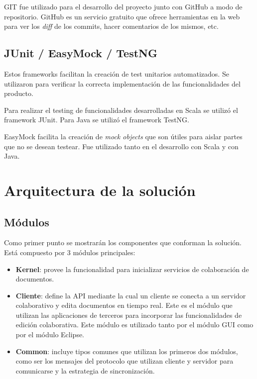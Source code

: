 \documentclass[12pt,a4paper]{article}
\let\stdsection\section
\renewcommand\section{\newpage\stdsection}
\begin{document}
GIT fue utilizado para el desarrollo del proyecto junto con GitHub \cite{github} a modo de repositorio. GitHub es un servicio
gratuito que ofrece herramientas en la web para ver los \textit{diff} de los commits, hacer comentarios de los mismos, etc.

\subsection{JUnit \cite{junit} / EasyMock \cite{easymock} / TestNG \cite{testng} }
Estos frameworks facilitan la creación de test unitarios automatizados. Se utilizaron para verificar la correcta
implementación de las funcionalidades del producto.

Para realizar el testing de funcionalidades desarrolladas en Scala se utilizó el framework JUnit. Para Java se utilizó
el framework TestNG.

EasyMock facilita la creación de \textit{mock objects} \cite{mocks} que son útiles para aislar partes que no se desean
testear. Fue utilizado tanto en el desarrollo con Scala y con Java.

\section{Arquitectura de la solución}

\subsection{Módulos}

Como primer punto se mostrarán los componentes que conforman la solución. Está compuesto por 3 módulos principales:

\begin{itemize}
	\item \textbf{Kernel}: provee la funcionalidad para inicializar servicios de colaboración de documentos.
	\item \textbf{Cliente}: define la API mediante la cual un cliente se conecta a un servidor colaborativo 
	y edita documentos
	en tiempo real. Este es el módulo que utilizan las aplicaciones de terceros para incorporar las funcionalidades
	de 	edición colaborativa. Este módulo es utilizado tanto por el módulo GUI como por el módulo Eclipse.
	\item \textbf{Common}: incluye tipos comunes que utilizan los primeros dos módulos, como ser los mensajes
	del protocolo que utilizan cliente y servidor para comunicarse y la estrategia de sincronización.
\end{itemize}
\end{document}
